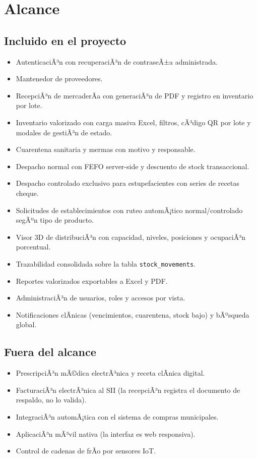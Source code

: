 ﻿\documentclass[a4paper, 12pt]{article}
\begin{document}
\section{Alcance}

\subsection{Incluido en el proyecto}
\begin{itemize}
    \item AutenticaciÃ³n con recuperaciÃ³n de contraseÃ±a administrada.
    \item Mantenedor de proveedores.
    \item RecepciÃ³n de mercaderÃ­a con generaciÃ³n de PDF y registro en inventario por lote.
    \item Inventario valorizado con carga masiva Excel, filtros, cÃ³digo QR por lote y modales de gestiÃ³n de estado.
    \item Cuarentena sanitaria y mermas con motivo y responsable.
    \item Despacho normal con FEFO server-side y descuento de stock transaccional.
    \item Despacho controlado exclusivo para estupefacientes con series de recetas cheque.
    \item Solicitudes de establecimientos con ruteo automÃ¡tico normal/controlado segÃºn tipo de producto.
    \item Visor 3D de distribuciÃ³n con capacidad, niveles, posiciones y ocupaciÃ³n porcentual.
    \item Trazabilidad consolidada sobre la tabla \texttt{stock\_movements}.
    \item Reportes valorizados exportables a Excel y PDF.
    \item AdministraciÃ³n de usuarios, roles y accesos por vista.
    \item Notificaciones clÃ­nicas (vencimientos, cuarentena, stock bajo) y bÃºsqueda global.
\end{itemize}

\subsection{Fuera del alcance}
\begin{itemize}
    \item PrescripciÃ³n mÃ©dica electrÃ³nica y receta clÃ­nica digital.
    \item FacturaciÃ³n electrÃ³nica al SII (la recepciÃ³n registra el documento de respaldo, no lo valida).
    \item IntegraciÃ³n automÃ¡tica con el sistema de compras municipales.
    \item AplicaciÃ³n mÃ³vil nativa (la interfaz es web responsiva).
    \item Control de cadenas de frÃ­o por sensores IoT.
\end{itemize}
\end{document}

